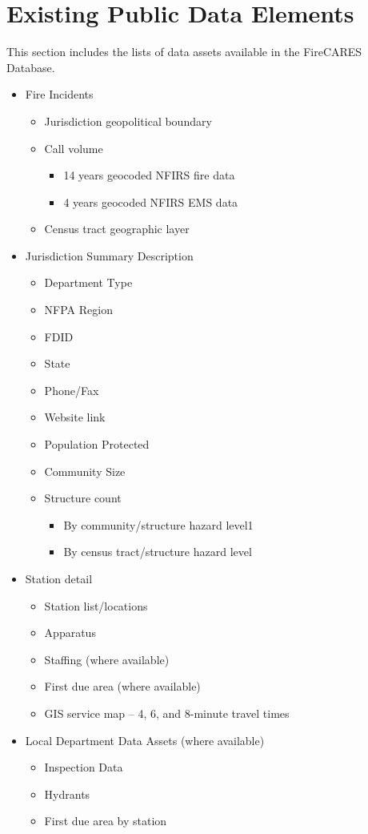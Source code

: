 \documentclass[12pt,oneside]{book}
\begin{document}
\chapter{Existing Public Data Elements }
This section includes the lists of data assets available in the FireCARES Database.
\begin{itemize}[noitemsep]
\item Fire Incidents
  \begin{itemize}[noitemsep]
  \item Jurisdiction geopolitical boundary
  \item Call volume
    \begin{itemize}[noitemsep]
    \item 14 years geocoded NFIRS fire data
    \item 4 years geocoded NFIRS EMS data
    \end{itemize}
  \item Census tract geographic layer
  \end{itemize}
\item Jurisdiction Summary Description
  \begin{itemize}[noitemsep]
  \item Department Type
  \item NFPA Region
  \item FDID
  \item State
  \item Phone/Fax
  \item Website link
  \item Population Protected
  \item Community Size
  \item Structure count
    \begin{itemize}[noitemsep]
    \item By community/structure hazard level1
    \item By census tract/structure hazard level
    \end{itemize}
  \end{itemize}
\item Station detail
  \begin{itemize}[noitemsep]
  \item Station list/locations
  \item Apparatus
  \item Staffing (where available)
  \item First due area (where available)
  \item GIS service map – 4, 6, and 8-minute travel times
  \end{itemize}
\item Local Department Data Assets (where available)
  \begin{itemize}[noitemsep]
  \item Inspection Data
  \item Hydrants
  \item First due area by station
  \end{itemize}
\end{itemize}
\end{document}
